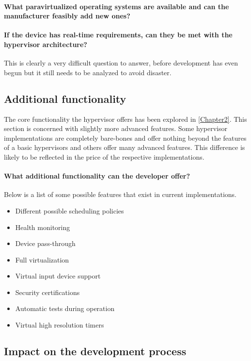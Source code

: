\paragraph{What paravirtualized operating systems are available and can the manufacturer feasibly add new ones?}

\paragraph{If the device has real-time requirements, can they be met with the hypervisor architecture?}
This is clearly a very difficult question to answer, before development has even begun but it still needs to be analyzed to avoid disaster.
\subsection{Additional functionality}
The core functionality the hypervisor offers has been explored in \ref{Chapter2}. This section is concerned with slightly more advanced features. Some hypervisor implementations are completely bare-bones and offer nothing beyond the features of a basic hypervisors and others offer many advanced features. This difference is likely to be reflected in the price of the respective implementations.
\paragraph{What additional functionality can the developer offer?}
Below is a list of some possible features that exist in current implementations.
\begin{itemize}
    \item Different possible scheduling policies
    \item Health monitoring
    \item Device pass-through
    \item Full virtualization
    \item Virtual input device support
    \item Security certifications
    \item Automatic tests during operation
    \item Virtual high resolution timers
\end{itemize}

\subsection{Impact on the development process}
